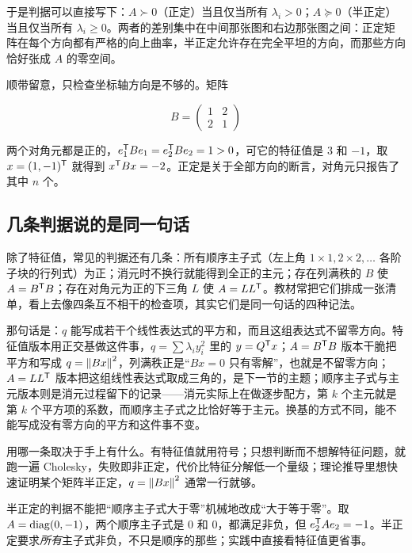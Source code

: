 于是判据可以直接写下：\(A\succ0\)（正定）当且仅当所有 \(\lambda_i>0\)；\(A\succeq0\)（半正定）当且仅当所有 \(\lambda_i\ge0\)。两者的差别集中在中间那张图和右边那张图之间：正定矩阵在每个方向都有严格的向上曲率，半正定允许存在完全平坦的方向，而那些方向恰好张成 \(A\) 的零空间。

顺带留意，只检查坐标轴方向是不够的。矩阵

\[
B=\begin{pmatrix}1&2\\2&1\end{pmatrix}
\]

两个对角元都是正的，\(e_1^{\mathsf{T}}Be_1=e_2^{\mathsf{T}}Be_2=1>0\)，可它的特征值是 3 和 \(-1\)，取 \(x=(1,-1)^{\mathsf{T}}\) 就得到 \(x^{\mathsf{T}}Bx=-2\)。正定是关于全部方向的断言，对角元只报告了其中 \(n\) 个。

\subsection{几条判据说的是同一句话}

除了特征值，常见的判据还有几条：所有顺序主子式（左上角 \(1\times1,2\times2,\ldots\) 各阶子块的行列式）为正；消元时不换行就能得到全正的主元；存在列满秩的 \(B\) 使 \(A=B^{\mathsf{T}}B\)；存在对角元为正的下三角 \(L\) 使 \(A=LL^{\mathsf{T}}\)。教材常把它们排成一张清单，看上去像四条互不相干的检查项，其实它们是同一句话的四种记法。

那句话是：\(q\) 能写成若干个线性表达式的平方和，而且这组表达式不留零方向。特征值版本用正交基做这件事，\(q=\sum\lambda_iy_i^2\) 里的 \(y=Q^{\mathsf{T}}x\)；\(A=B^{\mathsf{T}}B\) 版本干脆把平方和写成 \(q=\left\lVert Bx\right\rVert^2\)，列满秩正是``\(Bx=0\) 只有零解''，也就是不留零方向；\(A=LL^{\mathsf{T}}\) 版本把这组线性表达式取成三角的，是下一节的主题；顺序主子式与主元版本则是消元过程留下的记录——消元实际上在做逐步配方，第 \(k\) 个主元就是第 \(k\) 个平方项的系数，而顺序主子式之比恰好等于主元。换基的方式不同，能不能写成没有零方向的平方和这件事不变。

用哪一条取决于手上有什么。有特征值就用符号；只想判断而不想解特征问题，就跑一遍 Cholesky，失败即非正定，代价比特征分解低一个量级；理论推导里想快速证明某个矩阵半正定，\(q=\left\lVert Bx\right\rVert^2\) 通常一行就够。

\begin{remark}
半正定的判据不能把``顺序主子式大于零''机械地改成``大于等于零''。取 \(A=\operatorname{diag}(0,-1)\)，两个顺序主子式是 \(0\) 和 \(0\)，都满足非负，但 \(e_2^{\mathsf{T}}Ae_2=-1\)。半正定要求\emph{所有}主子式非负，不只是顺序的那些；实践中直接看特征值更省事。
\end{remark}

